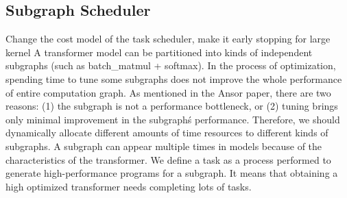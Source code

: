 \begin{algorithm}[htb]
\begin{algorithmic}[1]
    \EndFunction





      \label{code:recentEnd}
    \end{algorithmic}
  \end{algorithm}


\subsection{Subgraph Scheduler}


{\color{red} Change the cost model of the task scheduler, make it early stopping for large kernel}
A transformer model can be partitioned into kinds of independent subgraphs (such as batch\_matmul + softmax). In the process of 
optimization, spending time to tune some subgraphs does not improve the whole performance of entire computation graph. As mentioned in the Ansor paper, there
are two reasons: (1) the subgraph is not a performance bottleneck, or (2) tuning brings only minimal improvement in the subgraph\'s performance. Therefore, we
should dynamically allocate different amounts of time resources to different kinds of subgraphs. A subgraph can appear multiple times in models because of the 
characteristics of the transformer. We define a task as a process performed to generate high-performance programs for a subgraph. It means that obtaining a high
optimized transformer needs completing lots of tasks. 


